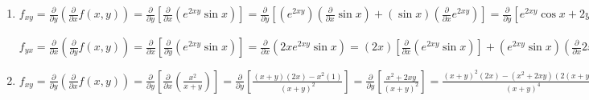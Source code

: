 \begin{Answer}
\begin{enumerate}
    \item $f_{xy} = \frac{\partial}{\partial y} \left( \frac{\partial}{
    \partial x} f(x, y) \right) = \frac{\partial}{\partial y} \left[ \frac{
    \partial}{\partial x} \left( e^{2xy} \sin{x} \right) \right] = \frac{
    \partial}{\partial y} \left[ \left(e^{2xy} \right) \left( \frac{\partial}{
    \partial x}\sin{x} \right) + \left( \sin{x} \right) \left( \frac{\partial}{
    \partial x} e^{2xy} \right) \right] = \frac{\partial}{\partial y} \left[ 
    e^{2xy}\cos{x} + 2ye^{2xy}\sin{x} \right] = \frac{\partial}{\partial y} 
    \left( e^{2xy} \cos{x} \right) + \frac{\partial}{\partial y} \left( 2ye^{
    2xy} \sin{x} \right) = 2xe^{2xy}\cos{x} + \left( 2y \right) \left( \frac{
    \partial}{\partial y}e^{2xy}\sin{x} \right) + \left(e^{2xy} \sin{x} \right)
    \left( \frac{\partial}{\partial y} 2y \right) = 2xe^{2xy}\cos{x} + 4xye^{
    2xy}\sin{x} + 2e^{2xy}\sin{x}$

    $f_{yx} = \frac{\partial}{\partial x} \left( \frac{\partial}{\partial y} 
    f(x, y) \right) = \frac{\partial}{\partial x} \left[ \frac{\partial}{
    \partial y} \left(e^{2xy} \sin{x} \right) \right] = \frac{\partial}{
    \partial x} \left( 2xe^{2xy} \sin{x} \right) = \left(2x \right) \left[ 
    \frac{\partial}{\partial x} \left( e^{2xy} \sin{x} \right) \right] + \left(
    e^{2xy} \sin{x} \right) \left( \frac{\partial}{\partial x} 2x \right) = 
    \left(2x \right) \left[ \left( e^{2xy} \right) \left( \frac{\partial}{
    \partial x} \sin{x} \right) + \left( \sin{x} \right) \left( \frac{
    \partial}{\partial x}e^{2xy} \right) \right] + 2e^{2xy}\sin{x} = 2xe^{2xy}
    \cos{x} + 4xye^{2xy}\sin{x} + 2e^{2xy}\sin{x} = f_{xy}$

    \item $f_{xy} = \frac{\partial}{\partial y} \left( \frac{\partial}{
    \partial x}f(x, y) \right) = \frac{\partial}{\partial y} \left[ \frac{
    \partial}{\partial x} \left( \frac{x^2}{x + y} \right) \right] = \frac{
    \partial}{\partial y} \left[ \frac{(x + y) \left( 2x \right) - x^2 \left(
    1 \right)}{\left( x + y \right)^2} \right] = \frac{\partial}{\partial y} 
    \left[ \frac{x^2 + 2xy}{\left( x + y \right)^2} \right] = \frac{\left( x + 
    y \right)^2 \left( 2x \right) - \left( x^2 + 2xy \right) \left(2(x + y) 
    \right)}{\left( x + y \right)^4} = \frac{\left( x^2 + 2xy + y^2 \right) 
    \left( 2x \right) - \left( x^2 + 2xy \right) \left( 2x + 2y \right)}{\left(
    x + y \right)^4} = \frac{2x^3 + 4x^2y + 2xy^2 - 2x^3 - 2x^2y - 4x^2y - 
    4xy^2}{\left( x + y \right)^4} = \frac{-2x^2y - 2xy^2}{\left( x + y \right)
    ^4}$


\end{enumerate}
\end{Answer}
